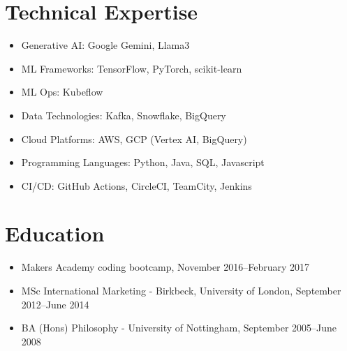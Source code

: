 \documentclass[a4paper]{scrartcl}
\begin{document}
\section*{Technical Expertise}
\begin{itemize}
	\item Generative AI: Google Gemini, Llama3
	\item ML Frameworks: TensorFlow, PyTorch, scikit-learn
	\item ML Ops: Kubeflow
	\item Data Technologies: Kafka, Snowflake, BigQuery
	\item Cloud Platforms: AWS, GCP (Vertex AI, BigQuery)
	\item Programming Languages: Python, Java, SQL, Javascript
	\item CI/CD: GitHub Actions, CircleCI, TeamCity, Jenkins
\end{itemize}

\section*{Education}
\begin{itemize}
	\item Makers Academy coding bootcamp, November 2016--February 2017
	\item MSc International Marketing - Birkbeck, University of London, September 2012--June 2014
	\item BA (Hons) Philosophy - University of Nottingham, September 2005--June 2008
\end{itemize}
\end{document}
